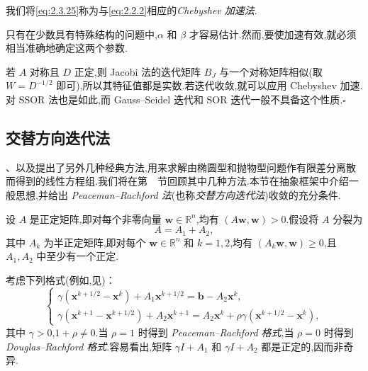 我们将\eqref{eq:2.3.25}称为与\eqref{eq:2.2.2}相应的\emph{Chebyshev 加速法}.

只有在少数具有特殊结构的问题中,\(\alpha\) 和 \(\beta\) 才容易估计.然而,要使加速有效,就必须相当准确地确定这两个参数.

\begin{note}
若 \(A\) 对称且 \(D\) 正定,则 Jacobi 法的迭代矩阵 \(B_J\) 与一个对称矩阵相似(取 \(W=D^{-1/2}\) 即可),所以其特征值都是实数.若迭代收敛,就可以应用 Chebyshev 加速.对 SSOR 法也是如此,而 Gauss--Seidel 迭代和 SOR 迭代一般不具备这个性质.\hfill\(\square\)
\end{note}

\subsection{交替方向迭代法}\label{sec:2.3.5}

、以及提出了另外几种经典方法,用来求解由椭圆型和抛物型问题作有限差分离散而得到的线性方程组.我们将在第~~节回顾其中几种方法.本节在抽象框架中介绍一般思想,并给出 \emph{Peaceman--Rachford 法}(也称\emph{交替方向迭代法})收敛的充分条件.

设 \(A\) 是正定矩阵,即对每个非零向量 \(\boldsymbol{w}\in\mathbb R^n\),均有 \((A\boldsymbol{w},\boldsymbol{w})>0\).假设将 \(A\) 分裂为
\begin{equation}\label{eq:2.3.26}
  A=A_1+A_2,
\end{equation}
其中 \(A_k\) 为半正定矩阵,即对每个 \(\boldsymbol{w}\in\mathbb R^n\) 和 \(k=1,2\),均有 \((A_k\boldsymbol{w},\boldsymbol{w})\ge0\),且 \(A_1,A_2\) 中至少有一个正定.

考虑下列格式(例如,见)：
\begin{equation}\label{eq:2.3.27}
  \begin{cases}
    \gamma(\boldsymbol{x}^{k+1/2}-\boldsymbol{x}^k)+A_1\boldsymbol{x}^{k+1/2}
      =\boldsymbol{b}-A_2\boldsymbol{x}^k,\\
    \gamma(\boldsymbol{x}^{k+1}-\boldsymbol{x}^{k+1/2})+A_2\boldsymbol{x}^{k+1}
      =A_2\boldsymbol{x}^k+\rho\gamma(\boldsymbol{x}^{k+1/2}-\boldsymbol{x}^k),
  \end{cases}
\end{equation}
其中 \(\gamma>0\),\(1+\rho\ne0\).当 \(\rho=1\) 时得到 \emph{Peaceman--Rachford 格式},当 \(\rho=0\) 时得到 \emph{Douglas--Rachford 格式}.容易看出,矩阵 \(\gamma I+A_1\) 和 \(\gamma I+A_2\) 都是正定的,因而非奇异.

